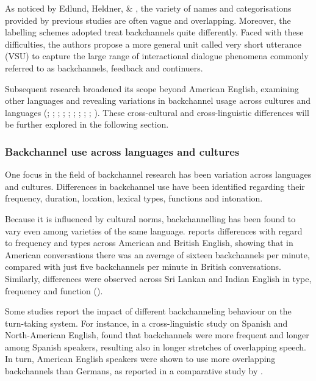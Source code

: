 As noticed by Edlund, Heldner, \& \citet{Pelcé2009}, the variety of names and categorisations provided by previous studies are often vague and overlapping. Moreover, the labelling schemes adopted treat backchannels quite differently. Faced with these difficulties, the authors propose a more general unit called very short utterance (VSU) to capture the large range of interactional dialogue phenomena commonly referred to as backchannels, feedback and continuers.

Subsequent research broadened its scope beyond American English, examining other languages and revealing variations in backchannel usage across cultures and languages (\citealt{Berry1994}; \citealt{ClancyEtAl1996}; \citealt{Cutrone2005,Cutrone2014}; \citealt{Heinz2003}; \citealt{KraazBernaisch2022}; \citealt{Li2006}; \citealt{Nurjaleka2019}; \citealt{TaoThompson1991}; \citealt{Tottie1991}; \citealt{WardTsukahara2000}). These cross-cultural and cross-linguistic differences will be further explored in the following section.

\subsubsection{Backchannel use across languages and cultures}
\hypertarget{Toc191305945}{}
One focus in the field of backchannel research has been variation across languages and cultures. Differences in backchannel use have been identified regarding their frequency, duration, location, lexical types, functions and intonation.

Because it is influenced by cultural norms, backchannelling has been found to vary even among varieties of the same language. \citet{Tottie1991} reports differences with regard to frequency and types across American and British English, showing that in American conversations there was an average of sixteen backchannels per minute, compared with just five backchannels per minute in British conversations. Similarly, differences were observed across Sri Lankan and Indian English in type, frequency and function (\citealt{KraazBernaisch2022}).

Some studies report the impact of different backchanneling behaviour on the turn-taking system. For instance, in a cross-linguistic study on Spanish and North-American English, \citet{Berry1994} found that backchannels were more frequent and longer among Spanish speakers, resulting also in longer stretches of overlapping speech. In turn, American English speakers were shown to use more overlapping backchannels than Germans, as reported in a comparative study by \citet{Heinz2003}.

